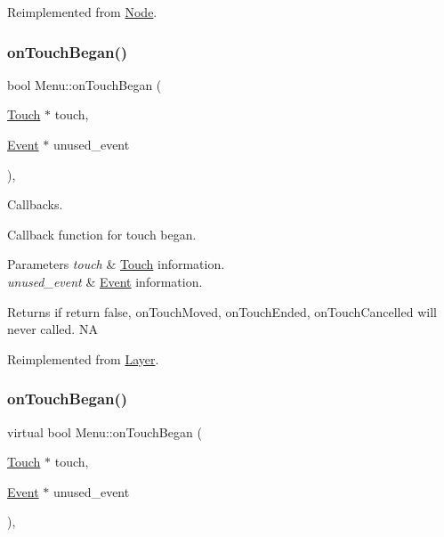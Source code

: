 Reimplemented from \hyperlink{classNode_ac83de835ea315e3179d4293acd8903ac}{Node}.

\mbox{\label{classMenu_aea88e7147647b3295a5453990c47f1be}} 
\subsubsection{\texorpdfstring{on\+Touch\+Began()}{onTouchBegan()}\hspace{0.1cm}{\footnotesize\ttfamily [1/2]}}
{\footnotesize\ttfamily bool Menu\+::on\+Touch\+Began (\begin{DoxyParamCaption}\item[{\hyperlink{classTouch}{Touch} $\ast$}]{touch,  }\item[{\hyperlink{classEvent}{Event} $\ast$}]{unused\+\_\+event }\end{DoxyParamCaption})\hspace{0.3cm}{\ttfamily [override]}, {\ttfamily [virtual]}}



Callbacks. 

Callback function for touch began.


\begin{DoxyParams}{Parameters}
{\em touch} & \hyperlink{classTouch}{Touch} information. \\
\hline
{\em unused\+\_\+event} & \hyperlink{classEvent}{Event} information. \\
\hline
\end{DoxyParams}
\begin{DoxyReturn}{Returns}
if return false, on\+Touch\+Moved, on\+Touch\+Ended, on\+Touch\+Cancelled will never called.  NA 
\end{DoxyReturn}


Reimplemented from \hyperlink{classLayer_abe632dc131bdeb3d603090d4d31db25c}{Layer}.

\mbox{\label{classMenu_a2492a2fef0ccf44baf794ebc7676d986}} 
\subsubsection{\texorpdfstring{on\+Touch\+Began()}{onTouchBegan()}\hspace{0.1cm}{\footnotesize\ttfamily [2/2]}}
{\footnotesize\ttfamily virtual bool Menu\+::on\+Touch\+Began (\begin{DoxyParamCaption}\item[{\hyperlink{classTouch}{Touch} $\ast$}]{touch,  }\item[{\hyperlink{classEvent}{Event} $\ast$}]{unused\+\_\+event }\end{DoxyParamCaption})\hspace{0.3cm}{\ttfamily [override]}, {\ttfamily [virtual]}}



